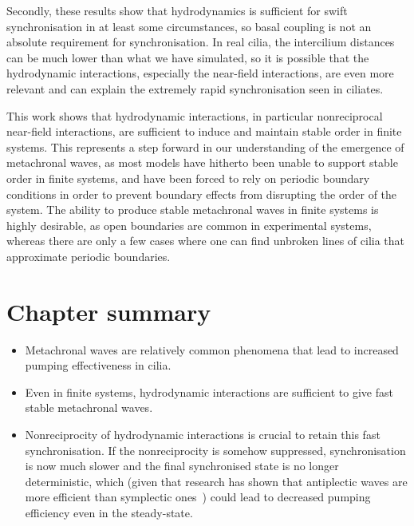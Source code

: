 Secondly, these results show that hydrodynamics is sufficient for swift synchronisation in at least some circumstances, so basal coupling is not an absolute requirement for synchronisation. In real cilia, the intercilium distances can be much lower than what we have simulated, so it is possible that the hydrodynamic interactions, especially the near-field interactions, are even more relevant and can explain the extremely rapid synchronisation seen in ciliates.

This work shows that hydrodynamic interactions, in particular nonreciprocal near-field interactions, are sufficient to induce and maintain stable order in finite systems. This represents a step forward in our understanding of the emergence of metachronal waves, as most models have hitherto been unable to support stable order in finite systems, and have been forced to rely on periodic boundary conditions in order to prevent boundary effects from disrupting the order of the system. The ability to produce stable metachronal waves in finite systems is highly desirable, as open boundaries are common in experimental systems, whereas there are only a few cases where one can find unbroken lines of cilia that approximate periodic boundaries.






\section{Chapter summary}

\begin{itemize}
    \item Metachronal waves are relatively common phenomena that lead to increased pumping effectiveness in cilia.
    \item Even in finite systems, hydrodynamic interactions are sufficient to give fast stable metachronal waves.
    \item Nonreciprocity of hydrodynamic interactions is crucial to retain this fast synchronisation. If the nonreciprocity is somehow suppressed, synchronisation is now much slower and the final synchronised state is no longer deterministic, which (given that research has shown that antiplectic waves are more efficient than symplectic ones~) could lead to decreased pumping efficiency even in the steady-state.
\end{itemize}